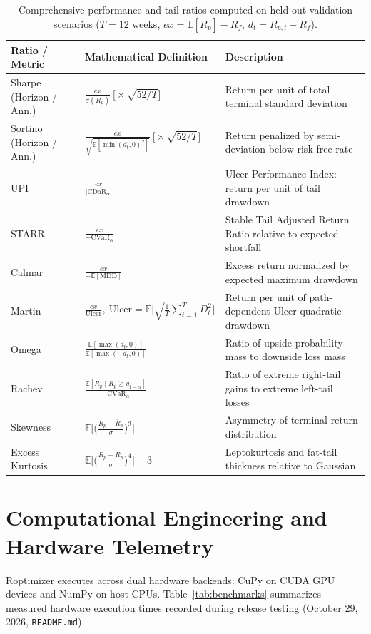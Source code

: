 \documentclass[11pt]{article}
\newcommand{\E}{\mathbb{E}}
\begin{document}
\begin{table}[H]
\centering
\caption{Comprehensive performance and tail ratios computed on held-out validation scenarios ($T = 12$ weeks,
$ex = \E[R_p] - R_f$, $d_t = R_{p, t} - R_f$).}
\label{tab:ratios}
\small
\setlength{\tabcolsep}{3pt}
\begin{tabular}{llp{6.4cm}}
\toprule
Ratio / Metric & Mathematical Definition & Description \\
\midrule
Sharpe (Horizon / Ann.) & $\frac{ex}{\sigma(R_p)} \ \Big[\times \sqrt{52/T}\Big]$ & Return per unit of total terminal standard deviation \\
Sortino (Horizon / Ann.) & $\frac{ex}{\sqrt{\E[\min(d_t, 0)^2]}} \ \Big[\times \sqrt{52/T}\Big]$ & Return penalized by semi-deviation below risk-free rate \\
UPI & $\frac{ex}{|\mathrm{CDaR}_\alpha|}$ & Ulcer Performance Index: return per unit of tail drawdown \\
STARR & $\frac{ex}{-\mathrm{CVaR}_\alpha}$ & Stable Tail Adjusted Return Ratio relative to expected shortfall \\
Calmar & $\frac{ex}{-\E[\mathrm{MDD}]}$ & Excess return normalized by expected maximum drawdown \\
Martin & $\frac{ex}{\mathrm{Ulcer}}, \ \mathrm{Ulcer} = \E\big[\sqrt{\frac{1}{T}\sum_{t=1}^T D_t^2}\big]$ & Return per unit of path-dependent Ulcer quadratic drawdown \\
Omega & $\frac{\E[\max(d_t, 0)]}{\E[\max(-d_t, 0)]}$ & Ratio of upside probability mass to downside loss mass \\
Rachev & $\frac{\E[R_p \mid R_p \ge q_{1-\alpha}]}{-\mathrm{CVaR}_\alpha}$ & Ratio of extreme right-tail gains to extreme left-tail losses \\
Skewness & $\E\big[\big(\frac{R_p - \bar{R}_p}{\sigma}\big)^3\big]$ & Asymmetry of terminal return distribution \\
Excess Kurtosis & $\E\big[\big(\frac{R_p - \bar{R}_p}{\sigma}\big)^4\big] - 3$ & Leptokurtosis and fat-tail thickness relative to Gaussian \\
\bottomrule
\end{tabular}
\end{table}

\section{Computational Engineering and Hardware Telemetry}
Roptimizer executes across dual hardware backends: CuPy on CUDA GPU devices and NumPy on host CPUs.
Table~\ref{tab:benchmarks} summarizes measured hardware execution times recorded during release testing
(October 29, 2026, \nolinkurl{README.md}).
\end{document}
